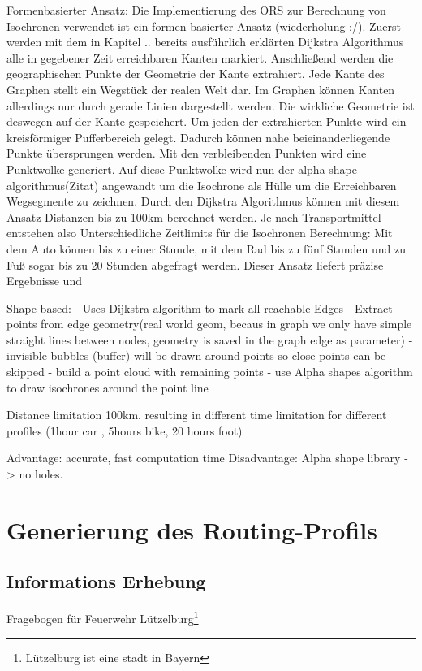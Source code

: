 \documentclass[10pt,a4paper]{article}
\begin{document}
Formenbasierter Ansatz:
Die Implementierung des ORS zur Berechnung von Isochronen verwendet ist ein formen basierter Ansatz (wiederholung :/). Zuerst werden mit dem in Kapitel .. bereits ausführlich erklärten Dijkstra Algorithmus alle in gegebener Zeit erreichbaren Kanten markiert. Anschließend werden die geographischen Punkte der Geometrie der Kante extrahiert. Jede Kante des Graphen stellt ein Wegstück der realen Welt dar. Im Graphen können Kanten allerdings nur durch gerade Linien dargestellt werden. Die wirkliche Geometrie ist deswegen auf der Kante gespeichert. Um jeden der extrahierten Punkte wird ein kreisförmiger Pufferbereich gelegt. Dadurch können nahe beieinanderliegende Punkte übersprungen werden. Mit den verbleibenden Punkten wird eine Punktwolke generiert. Auf diese Punktwolke wird nun der alpha shape algorithmus(Zitat) angewandt um die Isochrone als Hülle um die Erreichbaren Wegsegmente zu zeichnen.
Durch den Dijkstra Algorithmus können mit diesem Ansatz Distanzen bis zu 100km berechnet werden. Je nach Transportmittel entstehen also Unterschiedliche Zeitlimits für die Isochronen Berechnung: Mit dem Auto können bis zu einer Stunde, mit dem Rad bis zu fünf Stunden und zu Fuß sogar bis zu 20 Stunden abgefragt werden. Dieser Ansatz liefert präzise Ergebnisse und 

Shape based:
- Uses Dijkstra algorithm to mark all reachable Edges
- Extract points from edge geometry(real world geom, becaus in graph we only have simple straight lines between nodes, geometry is saved in the graph edge as parameter)
- invisible bubbles (buffer) will be drawn around points so close points can be skipped
- build a point cloud with remaining points
- use Alpha shapes algorithm to draw isochrones around the point line

 Distance limitation 100km. resulting in different time limitation for different profiles (1hour car , 5hours bike, 20 hours foot)

Advantage: accurate, fast computation time
Disadvantage: Alpha shape library -> no holes.



\section{Generierung des Routing-Profils}

\subsection{Informations Erhebung}
Fragebogen für Feuerwehr Lützelburg\footnote{Lützelburg ist eine stadt in Bayern}
\end{document}
